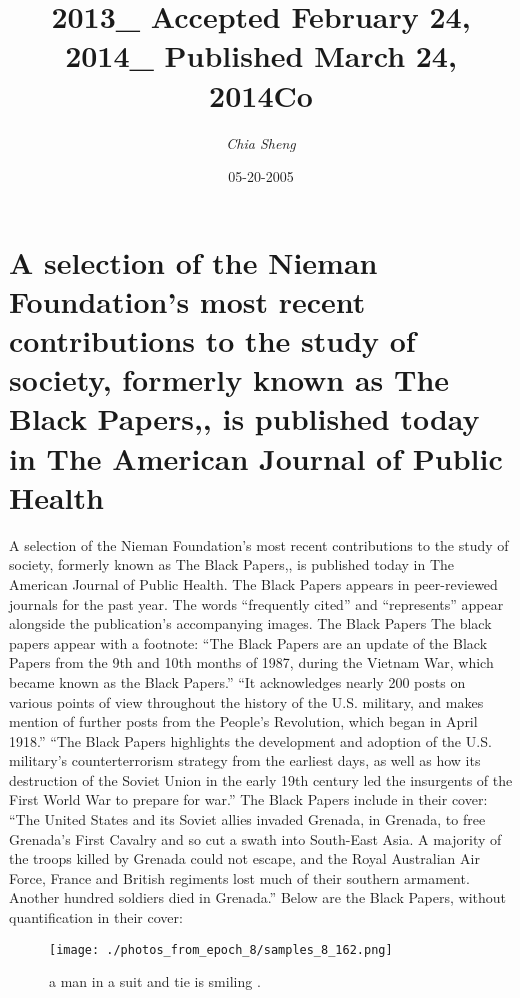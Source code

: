 \documentclass{article}%
\title{2013\_ Accepted February 24, 2014\_ Published March 24, 2014Co}%
\author{\textit{Chia Sheng}}%
\date{05-20-2005}%
\begin{document}
%
\normalsize%
\maketitle%
\section{A selection of the Nieman Foundation's most recent contributions to the study of society, formerly known as The Black Papers,, is published today in The American Journal of Public Health}%
\label{sec:AselectionoftheNiemanFoundationsmostrecentcontributionstothestudyofsociety,formerlyknownasTheBlackPapers,,ispublishedtodayinTheAmericanJournalofPublicHealth}%
A selection of the Nieman Foundation's most recent contributions to the study of society, formerly known as The Black Papers,, is published today in The American Journal of Public Health.\newline%
The Black Papers appears in peer{-}reviewed journals for the past year. The words “frequently cited” and “represents” appear alongside the publication’s accompanying images.\newline%
The Black Papers\newline%
The black papers appear with a footnote: “The Black Papers are an update of the Black Papers from the 9th and 10th months of 1987, during the Vietnam War, which became known as the Black Papers.” “It acknowledges nearly 200 posts on various points of view throughout the history of the U.S. military, and makes mention of further posts from the People’s Revolution, which began in April 1918.”\newline%
“The Black Papers highlights the development and adoption of the U.S. military’s counterterrorism strategy from the earliest days, as well as how its destruction of the Soviet Union in the early 19th century led the insurgents of the First World War to prepare for war.”\newline%
The Black Papers include in their cover: “The United States and its Soviet allies invaded Grenada, in Grenada, to free Grenada’s First Cavalry and so cut a swath into South{-}East Asia. A majority of the troops killed by Grenada could not escape, and the Royal Australian Air Force, France and British regiments lost much of their southern armament. Another hundred soldiers died in Grenada.”\newline%
Below are the Black Papers, without quantification in their cover:\newline%

%


\begin{figure}[h!]%
\centering%
\texttt{[image: ./photos\_from\_epoch\_8/samples\_8\_162.png]}%
\caption{a man in a suit and tie is smiling .}%
\end{figure}

%
\end{document}
